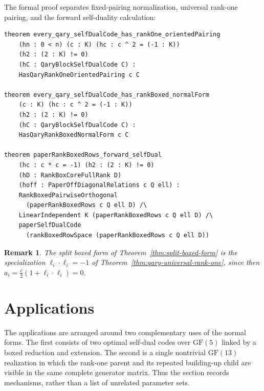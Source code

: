 \documentclass[12pt]{article}
\newtheorem{remark}[theorem]{Remark}
\newcommand{\GF}[1]{\ensuremath{\mathrm{GF}(#1)}}
\begin{document}
\noindent
The formal proof separates fixed-pairing normalization, universal rank-one
pairing, and the forward self-duality calculation:
\begin{lstlisting}[caption={Lean goals for Theorems~\ref{thm:qary-universal-rank-r} and~\ref{thm:qary-universal-rank-one}.}]
theorem every_qary_selfDualCode_has_rankOne_orientedPairing
    (hn : 0 < n) (c : K) (hc : c ^ 2 = (-1 : K))
    (h2 : (2 : K) != 0)
    (hC : QaryBlockSelfDualCode C) :
    HasQaryRankOneOrientedPairing c C

theorem every_qary_selfDualCode_has_rankBoxed_normalForm
    (c : K) (hc : c ^ 2 = (-1 : K))
    (h2 : (2 : K) != 0)
    (hC : QaryBlockSelfDualCode C) :
    HasQaryRankBoxedNormalForm c C

theorem paperRankBoxedRows_forward_selfDual
    (hc : c * c = -1) (h2 : (2 : K) != 0)
    (hD : RankBoxCoreFullRank D)
    (hoff : PaperOffDiagonalRelations c Q ell) :
    RankBoxedPairwiseOrthogonal
      (paperRankBoxedRows c Q ell D) /\
    LinearIndependent K (paperRankBoxedRows c Q ell D) /\
    paperSelfDualCode
      (rankBoxedRowSpace (paperRankBoxedRows c Q ell D))
\end{lstlisting}

\begin{remark}
\rm
The split boxed form of Theorem~\ref{thm:split-boxed-form} is the
specialization \(\ell_i\cdot\ell_i=-1\) of
Theorem~\ref{thm:qary-universal-rank-one}, since then
\(a_i=\frac c2(1+\ell_i\cdot\ell_i)=0\).
\end{remark}



  {}
  {}

\section{Applications}\label{sec:applications}

The applications are arranged around two complementary uses of the normal
forms.  The first consists of two optimal self-dual codes over \(\GF{5}\)
linked by a boxed reduction and extension.  The second is a single nontrivial
\(\GF{13}\) realization in which the rank-one parent and its repeated
building-up child are visible in the same complete generator matrix.  Thus
the section records mechanisms, rather than a list of unrelated parameter
sets.
\end{document}
